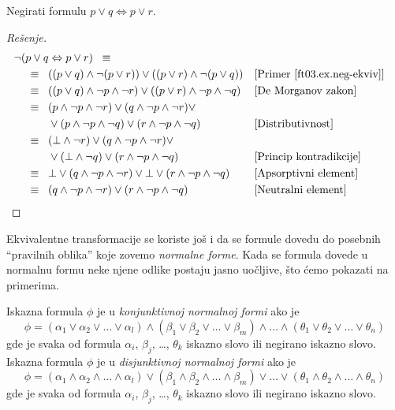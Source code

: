 \begin{EX}
  Negirati formulu $p \lor q \Leftrightarrow p \lor r$.
\end{EX}
\begin{proof}[Re\v senje]
  \begin{align*}
    \lnot&(p \lor q \Leftrightarrow p \lor r) \;\;\equiv\;\;\\
    &\;\;\equiv\;\; ((p \lor q) \land \lnot (p \lor r)) \lor ((p \lor r) \land \lnot(p \lor q))                      && \text{[Primer~\ref{ft03.ex.neg-ekviv}]}\\
    &\;\;\equiv\;\; ((p \lor q) \land \lnot p \land \lnot r) \lor ((p \lor r) \land \lnot p \land \lnot q)           && \text{[De Morganov zakon]}\\
    &\;\;\equiv\;\; (p \land \lnot p \land \lnot r) \lor (q \land \lnot p \land \lnot r) \lor\\
    &\text{\hphantom{$\;\;\;\;\equiv\;\;$}}\lor (p \land \lnot p \land \lnot q) \lor (r \land \lnot p \land \lnot q) && \text{[Distributivnost]}\\
    &\;\;\equiv\;\; (\bot \land \lnot r) \lor (q \land \lnot p \land \lnot r) \lor\\
    &\text{\hphantom{$\;\;\;\;\equiv\;\;$}}\lor (\bot \land \lnot q) \lor (r \land \lnot p \land \lnot q)            && \text{[Princip kontradikcije]}\\
    &\;\;\equiv\;\; \bot \lor (q \land \lnot p \land \lnot r) \lor \bot \lor (r \land \lnot p \land \lnot q)         && \text{[Apsorptivni element]}\\
    &\;\;\equiv\;\; (q \land \lnot p \land \lnot r) \lor (r \land \lnot p \land \lnot q)                             && \text{[Neutralni element]}\qedhere
  \end{align*}
\end{proof}

\ifBIOINF
\else

    \bigskip
    
    Ekvivalentne transformacije se koriste jo\v s i da se formule dovedu do posebnih \enquote{pravilnih oblika}
    koje zovemo \emph{normalne forme}. Kada se formula dovede u normalnu formu neke njene odlike postaju
    jasno uo\v cljive, \v sto \'cemo pokazati na primerima.
    
    \begin{DEF}
      Iskazna formula $\phi$ je u \emph{konjunktivnoj normalnoj formi} ako je
      $$
        \phi = (\alpha_1 \lor \alpha_2 \lor \ldots \lor \alpha_l) \land
               (\beta_1  \lor \beta_2  \lor \ldots \lor \beta_m)  \land \ldots \land
               (\theta_1 \lor \theta_2 \lor \ldots \lor \theta_n)
      $$
      gde je svaka od formula $\alpha_i$, $\beta_j$, \ldots, $\theta_k$ iskazno slovo ili negirano iskazno slovo.
      Iskazna formula $\phi$ je u \emph{disjunktivnoj normalnoj formi} ako je
      $$
        \phi = (\alpha_1 \land \alpha_2 \land \ldots \land \alpha_l) \lor
               (\beta_1  \land \beta_2  \land \ldots \land \beta_m)  \lor \ldots \lor
               (\theta_1 \land \theta_2 \land \ldots \land \theta_n)
      $$
      gde je svaka od formula $\alpha_i$, $\beta_j$, \ldots, $\theta_k$ iskazno slovo ili negirano iskazno slovo.
    \end{DEF}
    
